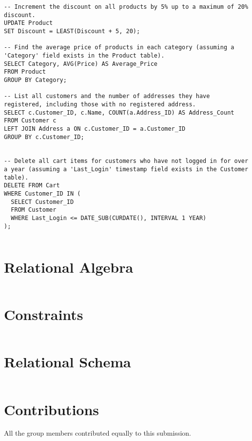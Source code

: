 \documentclass[12pt]{article}
\begin{document}
\begin{verbatim}
-- Increment the discount on all products by 5% up to a maximum of 20% discount.
UPDATE Product
SET Discount = LEAST(Discount + 5, 20);

-- Find the average price of products in each category (assuming a 'Category' field exists in the Product table).
SELECT Category, AVG(Price) AS Average_Price
FROM Product
GROUP BY Category;

-- List all customers and the number of addresses they have registered, including those with no registered address.
SELECT c.Customer_ID, c.Name, COUNT(a.Address_ID) AS Address_Count
FROM Customer c
LEFT JOIN Address a ON c.Customer_ID = a.Customer_ID
GROUP BY c.Customer_ID;


-- Delete all cart items for customers who have not logged in for over a year (assuming a 'Last_Login' timestamp field exists in the Customer table).
DELETE FROM Cart
WHERE Customer_ID IN (
  SELECT Customer_ID
  FROM Customer
  WHERE Last_Login <= DATE_SUB(CURDATE(), INTERVAL 1 YEAR)
);


\end{verbatim}


\section*{Relational Algebra}

\begin{verbatim}

\end{verbatim}


\section*{Constraints}

\begin{verbatim}

\end{verbatim}


\section*{Relational Schema}

\begin{verbatim}

\end{verbatim}


\section*{Contributions}
All the group members contributed equally to this submission.
\end{document}
